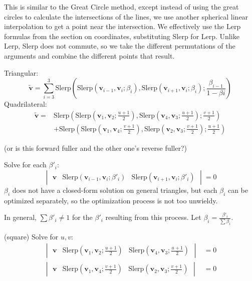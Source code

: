 \documentclass{amsart}[12pt]
\begin{document}
This is similar to the Great Circle method, except instead of using the great
circles to calculate the intersections of the lines, we use another spherical
linear interpolation to get a point near the intersection. We effectively use
the Lerp formulas from the section on coordinates, substituting Slerp for Lerp.
Unlike Lerp, Slerp does not commute, so we take the different permutations of
the arguments and combine the different points that result.

Triangular:
\begin{equation}\label{eq:fullert}
\widetilde{\mathbf v} = \sum^3_{i=3} \mathrm{Slerp}(
\mathrm{Slerp}(\mathbf v_{i-1}, \mathbf v_i; \beta_{i}),
\mathrm{Slerp}(\mathbf v_{i+1}, \mathbf v_i; \beta_{i});
\frac{\beta_{i-1}}{1-\beta{i}})
\end{equation}
Quadrilateral:%
\begin{equation}\label{eq:fullerq}
  \begin{split}
\widetilde{\mathbf v} =& \mathrm{Slerp}(
\mathrm{Slerp}(\mathbf v_1, \mathbf v_2; \frac{u+1}{2}),
\mathrm{Slerp}(\mathbf v_4, \mathbf v_3; \frac{u+1}{2}); \frac{v+1}{2})\\
&+ \mathrm{Slerp}(
\mathrm{Slerp}(\mathbf v_1, \mathbf v_4; \frac{v+1}{2}),
\mathrm{Slerp}(\mathbf v_2, \mathbf v_3; \frac{v+1}{2}); \frac{u+1}{2})
\end{split}
\end{equation}

(or is this forward fuller and the other one's reverse fuller?)

Solve for each $\beta'_i$:
\begin{equation}
\begin{vmatrix} \mathbf v &
\mathrm{Slerp}(\mathbf v_{i-1}, \mathbf v_i; \beta'_i) &
\mathrm{Slerp}(\mathbf v_{i+1}, \mathbf v_i; \beta'_i) \end{vmatrix} = 0
\end{equation}
$\beta_i$ does not have a closed-form solution on general triangles,
but each $\beta_i$ can be optimized separately,
so the optimization process is not too unwieldy.

In general, $\sum \beta'_i \ne 1$ for the $\beta'_i$ resulting from this
process. Let $\beta_i = \frac{\beta'_i }{\sum \beta_i}$.

(square)
Solve for $u, v$:
\begin{equation}
  \begin{split}
\begin{vmatrix} \mathbf v &
\mathrm{Slerp}(\mathbf v_1, \mathbf v_2; \frac{u+1}{2}) &
\mathrm{Slerp}(\mathbf v_4, \mathbf v_3; \frac{u+1}{2}) \end{vmatrix} &= 0 \\
\begin{vmatrix} \mathbf v &
\mathrm{Slerp}(\mathbf v_1, \mathbf v_4; \frac{v+1}{2}) &
\mathrm{Slerp}(\mathbf v_2, \mathbf v_3; \frac{v+1}{2}) \end{vmatrix} &= 0
\end{split}\end{equation}
\end{document}

